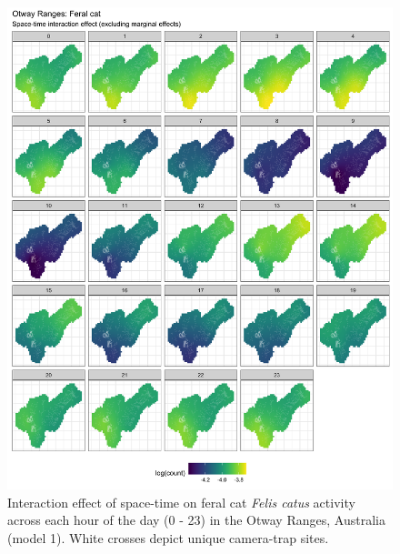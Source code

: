 \documentclass[]{elsarticle} %
\begin{document}
\begin{figure}

{\centering \includegraphics[width=1\linewidth]{../figs/spte_diff_avg_o_cat} 

}

\caption{Interaction effect of space-time on feral cat \textit{Felis catus} activity across each hour of the day (0 - 23) in the Otway Ranges, Australia (model 1). White crosses depict unique camera-trap sites. }\label{fig:diel-st-int-o-cat}
\end{figure}

\newpage
\end{document}
